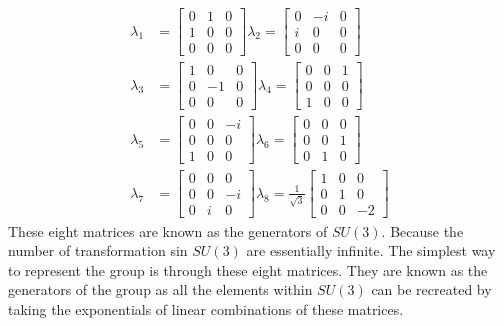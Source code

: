 \documentclass[12pt,journal,compsoc]{IEEEtran}
\begin{document}
\begin{align*}
\lambda_1 &= \left[ \begin{matrix}
	0 & 1 & 0\\
	1 & 0 & 0\\
	0 & 0 & 0
	\end{matrix} \right]
\lambda_2 = \left[ \begin{matrix}
	0 & -i & 0\\
	i & 0 & 0\\
	0 & 0 & 0
	\end{matrix} \right]\\
\lambda_3 &= \left[ \begin{matrix}
	1 & 0 & 0\\
	0 & -1 & 0\\
	0 & 0 & 0
	\end{matrix} \right]
\lambda_4 = \left[ \begin{matrix}
	0 & 0 & 1\\
	0 & 0 & 0\\
	1 & 0 & 0
	\end{matrix} \right] \\
\lambda_5 &= \left[ \begin{matrix}
	0 & 0 & -i\\
	0 & 0 & 0\\
	1 & 0 & 0
	\end{matrix} \right]
\lambda_6 = \left[ \begin{matrix}
	0 & 0 & 0\\
	0 & 0 & 1\\
	0 & 1 & 0
	\end{matrix} \right]\\
\lambda_7 &= \left[ \begin{matrix}
	0 & 0 & 0\\
	0 & 0 & -i\\
	0 & i & 0
	\end{matrix} \right]
\lambda_8 = \frac{1}{\sqrt{3}}\left[ \begin{matrix}
	1 & 0 & 0\\
	0 & 1 & 0\\
	0 & 0 & -2
	\end{matrix} \right]
\end{align*}
These eight matrices are known as the generators of $SU(3)$. Because the number of transformation sin $SU(3)$ are essentially infinite. The simplest way to represent the group is through these eight matrices. They are known as the generators of the group as all the elements within $SU(3)$ can be recreated by taking the exponentials of linear combinations of these matrices. \\\\
\end{document}
